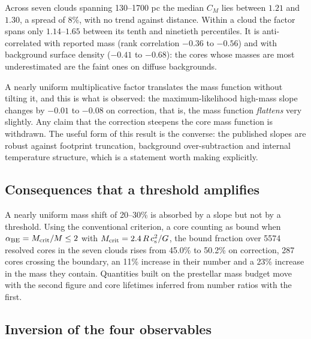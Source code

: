 \documentclass[11pt,a4paper]{article}
\begin{document}
Across seven clouds spanning 130--1700 pc the median $C_M$ lies between $1.21$
and $1.30$, a spread of 8\%, with no trend against distance. Within a cloud the
factor spans only $1.14$--$1.65$ between its tenth and ninetieth percentiles.
It is anti-correlated with reported mass (rank correlation $-0.36$ to $-0.56$)
and with background surface density ($-0.41$ to $-0.68$): the cores whose masses
are most underestimated are the faint ones on diffuse backgrounds.

A nearly uniform multiplicative factor translates the mass function without
tilting it, and this is what is observed: the maximum-likelihood high-mass slope
changes by $-0.01$ to $-0.08$ on correction, that is, the mass function
\emph{flattens} very slightly. Any claim that the correction steepens the core
mass function is withdrawn. The useful form of this result is the converse: the
published slopes are robust against footprint truncation, background
over-subtraction and internal temperature structure, which is a statement worth
making explicitly.

\subsection{Consequences that a threshold amplifies}
\label{sec:practice-bound}

A nearly uniform mass shift of 20--30\% is absorbed by a slope but not by a threshold. Using
the conventional criterion, a core counting as bound when
$\alpha_{\rm BE}=M_{\rm crit}/M \le 2$ with
$M_{\rm crit}=2.4\,R\,c_{\rm s}^2/G$, the bound fraction over 5574 resolved
cores in the seven clouds rises from 45.0\% to 50.2\% on correction, 287 cores
crossing the boundary, an 11\% increase in their number and a 23\% increase in
the mass they contain. Quantities built on the prestellar mass budget move with
the second figure and core lifetimes inferred from number ratios with the
first. 

\subsection{Inversion of the four observables}
\label{sec:practice-inversion}
\end{document}
